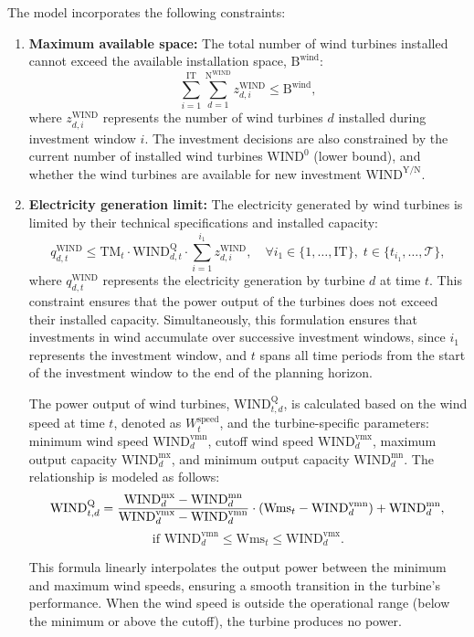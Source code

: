 \documentclass[11pt]{article}
\begin{document}
The model incorporates the following constraints:
\begin{enumerate}
    \item \textbf{Maximum available space:}
    The total number of wind turbines installed cannot exceed the available installation space, \(\text{B}^\text{wind}\):
    \[
    \sum_{i=1}^{\text{IT}} \sum_{d=1}^{\text{N}^\text{WIND}} z^\text{WIND}_{d,i} \leq \text{B}^\text{wind},
    \]
    where \(z^\text{WIND}_{d,i}\) represents the number of wind turbines \(d\) installed during investment window \(i\). The investment decisions are also constrained by the current number of installed wind turbines \(\text{WIND}^{0}\) (lower bound), and  whether the wind turbines are available for new investment \(\text{WIND}^\text{Y/N}\).

    \item \textbf{Electricity generation limit:}
    The electricity generated by wind turbines is limited by their technical specifications and installed capacity:
    \[
    q^\text{WIND}_{d,t} \leq \text{TM}_t \cdot \text{WIND}^\text{Q}_{d,t} \cdot \sum_{i=1}^{i_1} z^\text{WIND}_{d,i},
    \quad
    \forall i_1 \in \{1, \dots, \text{IT}\}, \; t \in \{t_{i_1}, \dots, \mathcal{T}\},
    \]
    where \(q^\text{WIND}_{d,t}\) represents the electricity generation by turbine \(d\) at time \(t\). This constraint ensures that the power output of the turbines does not exceed their installed capacity. Simultaneously, this formulation ensures that investments in wind accumulate over successive investment windows, since \(i_1\) represents the investment window, and \(t\) spans all time periods from the start of the investment window to the end of the planning horizon.

    The power output of wind turbines, \(\text{WIND}^\text{Q}_{t,d}\), is calculated based on the wind speed at time \(t\), denoted as \(W^\text{speed}_t\), and the turbine-specific parameters: minimum wind speed \(\text{WIND}^\text{vmn}_d\), cutoff wind speed \(\text{WIND}^\text{vmx}_d\), maximum output capacity \(\text{WIND}^\text{mx}_d\), and minimum output capacity \(\text{WIND}^\text{mn}_d\). The relationship is modeled as follows:
    \[
    \text{WIND}^\text{Q}_{t,d} =
    \frac{\text{WIND}^\text{mx}_d - \text{WIND}^\text{mn}_d}{\text{WIND}^\text{vmx}_d - \text{WIND}^\text{vmn}_d} \cdot (\text{Wms}_t - \text{WIND}^\text{vmn}_d) + \text{WIND}^\text{mn}_d, \\
    \]
    \[
    \text{if } \text{WIND}^\text{vmn}_d \leq \text{Wms}_t \leq \text{WIND}^\text{vmx}_d.
    \]
    
    This formula linearly interpolates the output power between the minimum and maximum wind speeds, ensuring a smooth transition in the turbine's performance. When the wind speed is outside the operational range (below the minimum or above the cutoff), the turbine produces no power.
    
\end{enumerate}
\end{document}
